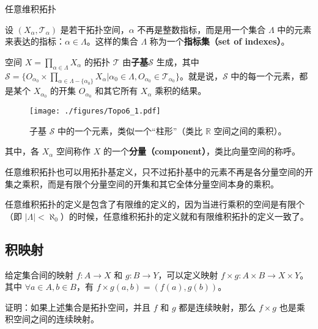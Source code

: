 \begin{definition}{任意维积拓扑}

设 $(X_\alpha, \mathcal{T}_\alpha)$ 是若干拓扑空间，$\alpha$ 不再是整数指标，而是用一个集合 $\Lambda$ 中的元素来表达的指标：$\alpha\in\Lambda$。这样的集合 $\Lambda$ 称为一个\textbf{指标集（set of indexes）}。

空间 $X=\prod\limits_{\alpha\in\Lambda}X_\alpha$ 的拓扑 $\mathcal{T}$ 由\textbf{子基}$\mathcal{S}$ 生成，其中 $\mathcal{S}=\{O_{\alpha_0}\times\prod\limits_{\alpha\in\Lambda-\{\alpha_0\}}X_\alpha|\alpha_0\in\Lambda, O_{\alpha_0}\in\mathcal{T}_{\alpha_0}\}$。就是说，$\mathcal{S}$ 中的每一个元素，都是某个 $X_{\alpha_0}$ 的开集 $O_{\alpha_0}$ 和其它所有 $X_\alpha$ 乘积的结果。

\begin{figure}[ht]
\centering
\texttt{[image: ./figures/Topo6\_1.pdf]}
\caption{子基 $\mathcal{S}$ 中的一个元素，类似一个“柱形”（类比 $\mathbb{R}$ 空间之间的乘积）。} \label{Topo6_fig1}
\end{figure}

其中，各 $X_\alpha$ 空间称作 $X$ 的一个\textbf{分量（component）}，类比向量空间的称呼。

\end{definition}

任意维积拓扑也可以用拓扑基定义，只不过拓扑基中的元素不再是各分量空间的开集之乘积，而是有限个分量空间的开集和其它全体分量空间本身的乘积。

任意维积拓扑的定义是包含了有限维的定义的，因为当进行乘积的空间是有限个（即 $|\Lambda|<\aleph_0$）的时候，任意维积拓扑的定义就和有限维积拓扑的定义一致了。

\subsection{积映射}

给定集合间的映射 $f:A\rightarrow X$ 和 $g:B\rightarrow Y$，可以定义映射 $f\times g:A\times B\rightarrow X\times Y$。其中 $\forall a\in A, b\in B$，有 $f\times g(a, b)=(f(a), g(b))$。

\begin{exercise}{}\label{Topo6_exe1}
证明：如果上述集合是拓扑空间，并且 $f$ 和 $g$ 都是连续映射，那么 $f\times g$ 也是乘积空间之间的连续映射。
\end{exercise}



